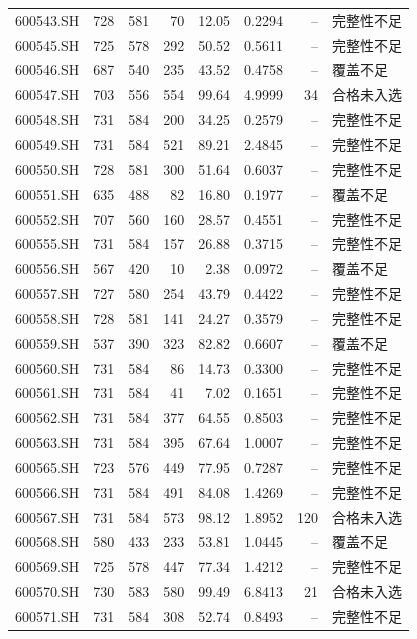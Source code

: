 \documentclass[10pt,a4paper]{article}
\begin{document}
\begin{longtable}{lrrr r r r l}
600543.SH & 728 & 581 & 70 & 12.05 & 0.2294 & -- & 完整性不足\\
600545.SH & 725 & 578 & 292 & 50.52 & 0.5611 & -- & 完整性不足\\
600546.SH & 687 & 540 & 235 & 43.52 & 0.4758 & -- & 覆盖不足\\
600547.SH & 703 & 556 & 554 & 99.64 & 4.9999 & 34 & 合格未入选\\
600548.SH & 731 & 584 & 200 & 34.25 & 0.2579 & -- & 完整性不足\\
600549.SH & 731 & 584 & 521 & 89.21 & 2.4845 & -- & 完整性不足\\
600550.SH & 728 & 581 & 300 & 51.64 & 0.6037 & -- & 完整性不足\\
600551.SH & 635 & 488 & 82 & 16.80 & 0.1977 & -- & 覆盖不足\\
600552.SH & 707 & 560 & 160 & 28.57 & 0.4551 & -- & 完整性不足\\
600555.SH & 731 & 584 & 157 & 26.88 & 0.3715 & -- & 完整性不足\\
600556.SH & 567 & 420 & 10 & 2.38 & 0.0972 & -- & 覆盖不足\\
600557.SH & 727 & 580 & 254 & 43.79 & 0.4422 & -- & 完整性不足\\
600558.SH & 728 & 581 & 141 & 24.27 & 0.3579 & -- & 完整性不足\\
600559.SH & 537 & 390 & 323 & 82.82 & 0.6607 & -- & 覆盖不足\\
600560.SH & 731 & 584 & 86 & 14.73 & 0.3300 & -- & 完整性不足\\
600561.SH & 731 & 584 & 41 & 7.02 & 0.1651 & -- & 完整性不足\\
600562.SH & 731 & 584 & 377 & 64.55 & 0.8503 & -- & 完整性不足\\
600563.SH & 731 & 584 & 395 & 67.64 & 1.0007 & -- & 完整性不足\\
600565.SH & 723 & 576 & 449 & 77.95 & 0.7287 & -- & 完整性不足\\
600566.SH & 731 & 584 & 491 & 84.08 & 1.4269 & -- & 完整性不足\\
600567.SH & 731 & 584 & 573 & 98.12 & 1.8952 & 120 & 合格未入选\\
600568.SH & 580 & 433 & 233 & 53.81 & 1.0445 & -- & 覆盖不足\\
600569.SH & 725 & 578 & 447 & 77.34 & 1.4212 & -- & 完整性不足\\
600570.SH & 730 & 583 & 580 & 99.49 & 6.8413 & 21 & 合格未入选\\
600571.SH & 731 & 584 & 308 & 52.74 & 0.8493 & -- & 完整性不足\\

\end{longtable}
\end{document}
